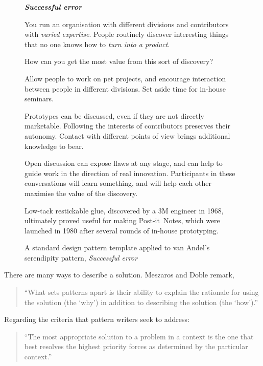 \begin{figure}[!t]
{\normalsize
\begin{mdframed}
\vspace{2mm}
\textbf{\emph{Successful error}}~
\begin{description}[leftmargin=0\parindent,labelindent=0em,itemsep=2pt]
\item[{Context.}] You run an organisation with different
  divisions and contributors with {\sl varied expertise}.  People routinely
  discover interesting things that no one knows how to {\sl
    turn into a product}.
\item[{Problem.}]  How can you get the most value from this sort of discovery?
\item[{Solution.}] Allow people to work on pet projects, and encourage
  interaction between people in different divisions.  Set aside time
  for in-house seminars.
\item[{Rationale.}] Prototypes can be discussed, even if they are not
  directly marketable.  Following the interests of contributors
  preserves their autonomy.  Contact with different points of view
  brings additional knowledge to bear.
\item[{Resolution.}] 
Open discussion can
  expose flaws at any stage, and can help to guide work in the direction of
  real innovation.  Participants in these conversations
  will learn something, and will help each other maximise the value of
  the discovery.  
\item[{Example.}] Low-tack restickable glue, discovered by a 3M
  engineer in 1968, ultimately proved useful for making
  Post-it\texttrademark\ Notes, which were launched in 1980 after
  several rounds of in-house prototyping.
\end{description}
\vspace{-1mm}
\end{mdframed}
}
\caption{A standard design pattern template applied to van Andel's serendipity pattern, \em{Successful error}\label{fig:va-pattern-figure}}
\end{figure}

\noindent There are many ways to describe a solution. Meszaros and Doble remark,
\begin{quote}
\noindent ``What sets patterns apart is their ability to explain the
rationale for using the solution (the `why') in addition to describing
the solution (the `how').''
\end{quote}
Regarding the criteria that pattern writers seek to address: 
\begin{quote}
\noindent ``The most appropriate solution to a problem in a context is
the one that best resolves the highest priority forces as determined
by the particular context.''
\end{quote}

